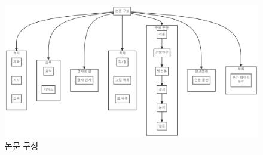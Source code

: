 \documentclass[
  letterpaper,
]{book}
\begin{document}
\begin{figure}

{\centering \includegraphics{images/mermaid_thesis.png}

}

\caption{논문 구성}

\end{figure}
\end{document}
